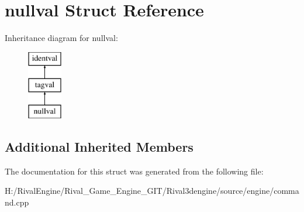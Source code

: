 \hypertarget{structnullval}{}\section{nullval Struct Reference}
\label{structnullval}
Inheritance diagram for nullval\+:\begin{figure}[H]
\begin{center}
\leavevmode
\includegraphics[height=3.000000cm]{structnullval}
\end{center}
\end{figure}
\subsection*{Additional Inherited Members}


The documentation for this struct was generated from the following file\+:\begin{DoxyCompactItemize}
\item 
H\+:/\+Rival\+Engine/\+Rival\+\_\+\+Game\+\_\+\+Engine\+\_\+\+G\+I\+T/\+Rival3dengine/source/engine/command.\+cpp\end{DoxyCompactItemize}
